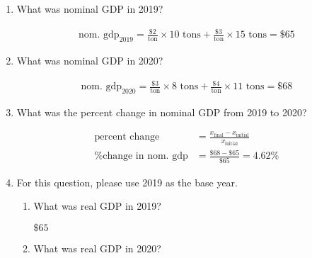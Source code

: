 \documentclass[
    letterpaper,paper=portrait,fleqn,
    DIV=16,fontsize=12pt,twoside=semi,
    parskip=full-,
    headings=standardclasses]
{scrartcl}
\begin{document}
\begin{enumerate}

\item What was nominal GDP in 2019?

\begin{solution}
\vspace{-1.0\baselineskip}
\begin{align*}
\text{nom. gdp}_\text{2019} = \frac{\$2}{\text{ton}} \times 10 \text{ tons} + \frac{\$3}{\text{ton}} \times 15 \text{ tons} = \$65
\end{align*}
\end{solution}

\item What was nominal GDP in 2020?

\begin{solution}
\vspace{-1.0\baselineskip}
\begin{align*}
\text{nom. gdp}_\text{2020} = \frac{\$3}{\text{ton}} \times 8 \text{ tons} + \frac{\$4}{\text{ton}} \times 11 \text{ tons} = \$68
\end{align*}
\end{solution}

\item What was the percent change in nominal GDP from 2019 to 2020?

\begin{solution}
\vspace{-1.0\baselineskip}
\begin{align*}
\text{percent change} &= \frac{ x_\text{final} - x_\text{initial} }{ x_\text{initial} } \\
\text{\% change in nom. gdp} &= \frac{\$68 - \$65}{\$65} = 4.62\%
\end{align*}
\end{solution}

\item For this question, please use 2019 as the base year.

\begin{enumerate}

\vspace{-6pt}
\item What was real GDP in 2019?

\begin{solution}
$\$65$
\end{solution}

\vspace{-6pt}
\item What was real GDP in 2020?


\end{enumerate}
\end{enumerate}
\end{document}
